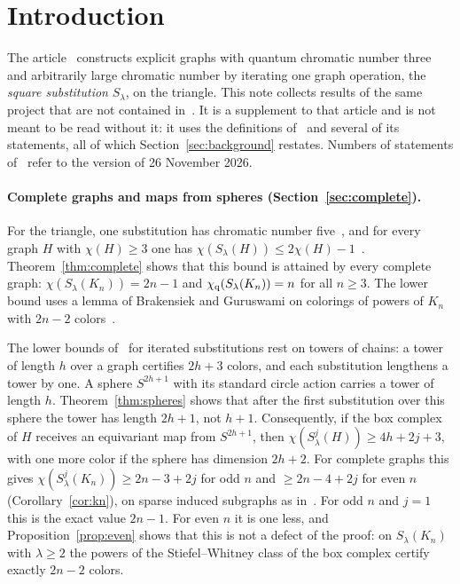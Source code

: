 \section{Introduction}\label{sec:intro}

The article~\cite{Z} constructs explicit graphs with quantum chromatic number three and arbitrarily large chromatic number by iterating one graph operation, the \emph{square substitution} $S_\lambda$, on the triangle. This note collects results of the same project that are not contained in~\cite{Z}. It is a supplement to that article and is not meant to be read without it: it uses the definitions of~\cite{Z} and several of its statements, all of which Section~\ref{sec:background} restates. Numbers of statements of~\cite{Z} refer to the version of 26 November 2026.

\paragraph{Complete graphs and maps from spheres (Section~\ref{sec:complete}).}
For the triangle, one substitution has chromatic number five~\cite[Theorem~2.4]{Z}, and for every graph $H$ with $\chi(H)\ge3$ one has $\chi(S_\lambda(H))\le2\chi(H)-1$~\cite[Proposition~A.1]{Z}. Theorem~\ref{thm:complete} shows that this bound is attained by every complete graph: $\chi(S_\lambda(K_n))=2n-1$ and $\chi_{\mathrm q}(S_\lambda(K_n))=n$ for all $n\ge3$. The lower bound uses a lemma of Brakensiek and Guruswami on colorings of powers of $K_n$ with $2n-2$ colors~\cite{BG}.

The lower bounds of~\cite{Z} for iterated substitutions rest on towers of chains: a tower of length $h$ over a graph certifies $2h+3$ colors, and each substitution lengthens a tower by one. A sphere $S^{2h+1}$ with its standard circle action carries a tower of length $h$. Theorem~\ref{thm:spheres} shows that after the first substitution over this sphere the tower has length $2h+1$, not $h+1$. Consequently, if the box complex of $H$ receives an equivariant map from $S^{2h+1}$, then $\chi(S^j_\lambda(H))\ge4h+2j+3$, with one more color if the sphere has dimension $2h+2$. For complete graphs this gives $\chi(S^j_\lambda(K_n))\ge2n-3+2j$ for odd $n$ and $\ge2n-4+2j$ for even $n$ (Corollary~\ref{cor:kn}), on sparse induced subgraphs as in~\cite{Z}. For odd $n$ and $j=1$ this is the exact value $2n-1$. For even $n$ it is one less, and Proposition~\ref{prop:even} shows that this is not a defect of the proof: on $S_\lambda(K_n)$ with $\lambda\ge2$ the powers of the Stiefel--Whitney class of the box complex certify exactly $2n-2$ colors.

